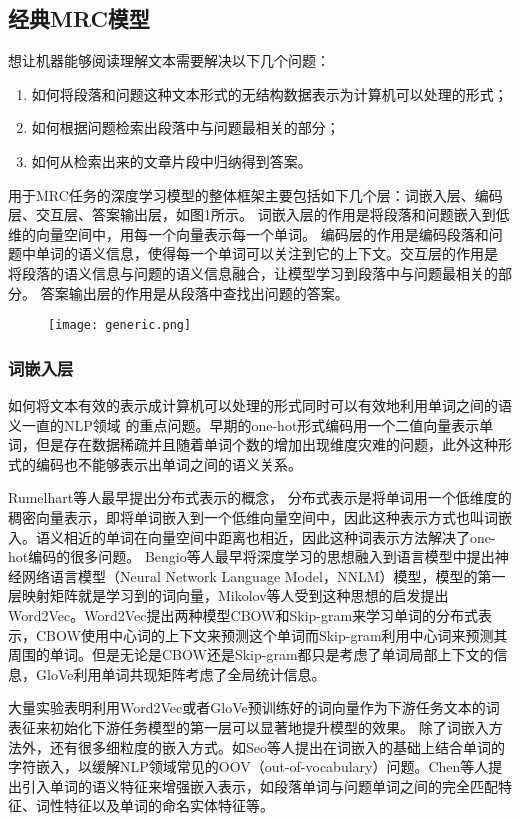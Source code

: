 \subsection{经典MRC模型}
想让机器能够阅读理解文本需要解决以下几个问题：
\begin{enumerate}
	\item 如何将段落和问题这种文本形式的无结构数据表示为计算机可以处理的形式；
	\item 如何根据问题检索出段落中与问题最相关的部分；
	\item 如何从检索出来的文章片段中归纳得到答案。
\end{enumerate}
用于MRC任务的深度学习模型的整体框架主要包括如下几个层：词嵌入层、编码层、交互层、答案输出层，如图1所示。
词嵌入层的作用是将段落和问题嵌入到低维的向量空间中，用每一个向量表示每一个单词。
编码层的作用是编码段落和问题中单词的语义信息，使得每一个单词可以关注到它的上下文。交互层的作用是
将段落的语义信息与问题的语义信息融合，让模型学习到段落中与问题最相关的部分。
答案输出层的作用是从段落中查找出问题的答案。
\begin{figure}
	\centering
	\texttt{[image: generic.png]}
\end{figure}

\subsubsection{词嵌入层}
如何将文本有效的表示成计算机可以处理的形式同时可以有效地利用单词之间的语义一直的NLP领域
的重点问题。早期的one-hot形式编码用一个二值向量表示单词，但是存在数据稀疏并且随着单词个数的增加出现维度灾难的问题，此外这种形式的编码也不能够表示出单词之间的语义关系。

Rumelhart等人最早提出分布式表示的概念，
分布式表示是将单词用一个低维度的稠密向量表示，即将单词嵌入到一个低维向量空间中，因此这种表示方式也叫词嵌入。语义相近的单词在向量空间中距离也相近，因此这种词表示方法解决了one-hot编码的很多问题。
Bengio等人\cite{NNLM}最早将深度学习的思想融入到语言模型中提出神经网络语言模型（Neural Network Language Model，NNLM）模型，模型的第一层映射矩阵就是学习到的词向量，Mikolov等人受到这种思想的启发提出Word2Vec。Word2Vec提出两种模型CBOW和Skip-gram来学习单词的分布式表示，CBOW使用中心词的上下文来预测这个单词而Skip-gram利用中心词来预测其周围的单词。但是无论是CBOW还是Skip-gram都只是考虑了单词局部上下文的信息，GloVe利用单词共现矩阵考虑了全局统计信息。


大量实验表明利用Word2Vec或者GloVe预训练好的词向量作为下游任务文本的词表征来初始化下游任务模型的第一层可以显著地提升模型的效果。
除了词嵌入方法外，还有很多细粒度的嵌入方式。如Seo等人提出在词嵌入的基础上结合单词的字符嵌入，以缓解NLP领域常见的OOV（out-of-vocabulary）问题。Chen等人提出引入单词的语义特征来增强嵌入表示，如段落单词与问题单词之间的完全匹配特征、词性特征以及单词的命名实体特征等。

